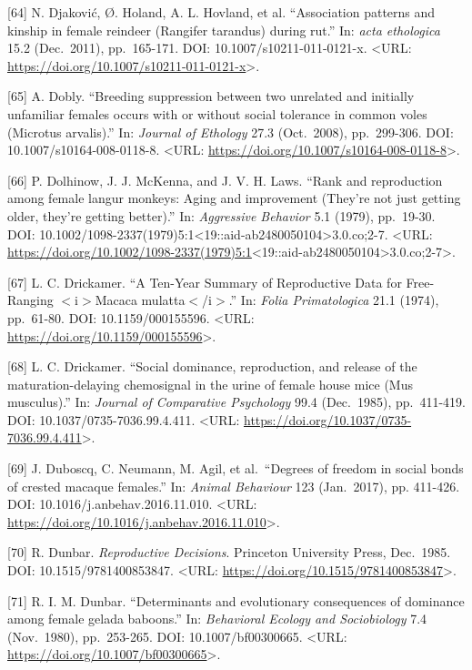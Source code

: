 \documentclass[
]{article}
\begin{document}
{[}64{]} N. Djaković, Ø. Holand, A. L. Hovland, et al. ``Association
patterns and kinship in female reindeer (Rangifer tarandus) during
rut.'' In: \emph{acta ethologica} 15.2 (Dec.~2011), pp.~165-171. DOI:
10.1007/s10211-011-0121-x. \textless URL:
\url{https://doi.org/10.1007/s10211-011-0121-x}\textgreater.

{[}65{]} A. Dobly. ``Breeding suppression between two unrelated and
initially unfamiliar females occurs with or without social tolerance in
common voles (Microtus arvalis).'' In: \emph{Journal of Ethology} 27.3
(Oct.~2008), pp.~299-306. DOI: 10.1007/s10164-008-0118-8. \textless URL:
\url{https://doi.org/10.1007/s10164-008-0118-8}\textgreater.

{[}66{]} P. Dolhinow, J. J. McKenna, and J. V. H. Laws. ``Rank and
reproduction among female langur monkeys: Aging and improvement (They're
not just getting older, they're getting better).'' In: \emph{Aggressive
Behavior} 5.1 (1979), pp.~19-30. DOI:
10.1002/1098-2337(1979)5:1\textless19::aid-ab2480050104\textgreater3.0.co;2-7.
\textless URL:
\url{https://doi.org/10.1002/1098-2337(1979)5:1}\textless19::aid-ab2480050104\textgreater3.0.co;2-7\textgreater.

{[}67{]} L. C. Drickamer. ``A Ten-Year Summary of Reproductive Data for
Free-Ranging \(\less\)i\(\greater\)Macaca
mulatta\(\less\)/i\(\greater\).'' In: \emph{Folia Primatologica} 21.1
(1974), pp.~61-80. DOI: 10.1159/000155596. \textless URL:
\url{https://doi.org/10.1159/000155596}\textgreater.

{[}68{]} L. C. Drickamer. ``Social dominance, reproduction, and release
of the maturation-delaying chemosignal in the urine of female house mice
(Mus musculus).'' In: \emph{Journal of Comparative Psychology} 99.4
(Dec.~1985), pp.~411-419. DOI: 10.1037/0735-7036.99.4.411.
\textless URL:
\url{https://doi.org/10.1037/0735-7036.99.4.411}\textgreater.

{[}69{]} J. Duboscq, C. Neumann, M. Agil, et al.~``Degrees of freedom in
social bonds of crested macaque females.'' In: \emph{Animal Behaviour}
123 (Jan.~2017), pp. 411-426. DOI: 10.1016/j.anbehav.2016.11.010.
\textless URL:
\url{https://doi.org/10.1016/j.anbehav.2016.11.010}\textgreater.

{[}70{]} R. Dunbar. \emph{Reproductive Decisions}. Princeton University
Press, Dec.~1985. DOI: 10.1515/9781400853847. \textless URL:
\url{https://doi.org/10.1515/9781400853847}\textgreater.

{[}71{]} R. I. M. Dunbar. ``Determinants and evolutionary consequences
of dominance among female gelada baboons.'' In: \emph{Behavioral Ecology
and Sociobiology} 7.4 (Nov.~1980), pp.~253-265. DOI: 10.1007/bf00300665.
\textless URL: \url{https://doi.org/10.1007/bf00300665}\textgreater.
\end{document}
